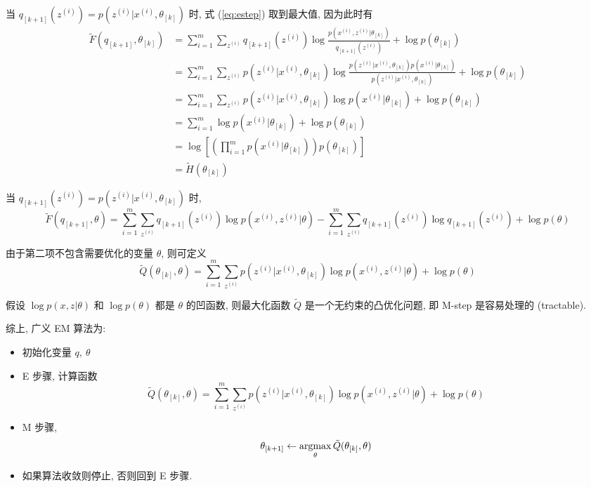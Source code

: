 \documentclass{article}
\begin{document}
当 $q_{[k+1]}(z^{(i)})=p(z^{(i)}|x^{(i)},\theta_{[k]})$ 时, 式 (\ref{eq:estep}) 取到最大值, 因为此时有
\begin{equation}
  \begin{aligned}
    \tilde{F}(q_{[k+1]},\theta_{[k]})
    &=\sum_{i=1}^m\sum_{z^{(i)}}q_{[k+1]}(z^{(i)})\log \frac{p\left(x^{(i)},z^{(i)}|\theta_{[k]}\right)}{q_{[k+1]}(z^{(i)})}+\log p(\theta_{[k]})\\
    &=\sum_{i=1}^m\sum_{z^{(i)}}p(z^{(i)}|x^{(i)},\theta_{[k]})\log \frac{p(z^{(i)}|x^{(i)},\theta_{[k]})p(x^{(i)}|\theta_{[k]})}{p(z^{(i)}|x^{(i)},\theta_{[k]})}+\log p(\theta_{[k]})\\
    &=\sum_{i=1}^m\sum_{z^{(i)}}p(z^{(i)}|x^{(i)},\theta_{[k]})\log p(x^{(i)}|\theta_{[k]})+\log p(\theta_{[k]})\\
    &=\sum_{i=1}^m\log p(x^{(i)}|\theta_{[k]})+\log p(\theta_{[k]})\\
    &=\log\left[\left(\prod_{i = 1}^mp(x^{(i)}|\theta_{[k]})\right)p(\theta_{[k]})\right]\\
    &=\tilde{H}(\theta_{[k]})
  \end{aligned}
  \label{eq:posterior}
\end{equation}

当 $q_{[k+1]}(z^{(i)})=p(z^{(i)}|x^{(i)},\theta_{[k]})$ 时, 
\begin{equation}
  \tilde{F}(q_{[k+1]},\theta)=\sum_{i=1}^m\sum_{z^{(i)}}q_{[k+1]}(z^{(i)})\log p\left(x^{(i)},z^{(i)}|\theta\right)-\sum_{i=1}^m\sum_{z^{(i)}}q_{[k+1]}(z^{(i)})\log q_{[k+1]}(z^{(i)})+\log p(\theta)
\end{equation}

由于第二项不包含需要优化的变量 $\theta$, 则可定义
\begin{equation}
  \tilde{Q}(\theta_{[k]},\theta)=\sum_{i=1}^m\sum_{z^{(i)}}p(z^{(i)}|x^{(i)},\theta_{[k]})\log p\left(x^{(i)},z^{(i)}|\theta\right)+\log p(\theta)
\end{equation}

假设 $\log p(x,z|\theta)$ 和 $\log p(\theta)$ 都是 $\theta$ 的凹函数, 则最大化函数 $\tilde{Q}$ 是一个无约束的凸优化问题, 即 M-step 是容易处理的 (tractable).

综上, 广义 EM 算法为:
\begin{itemize}
  \item 初始化变量 $q,~\theta$
  \item E 步骤, 计算函数 
    \begin{equation}
      \tilde{Q}(\theta_{[k]},\theta)=\sum_{i=1}^m\sum_{z^{(i)}}p(z^{(i)}|x^{(i)},\theta_{[k]})\log p\left(x^{(i)},z^{(i)}|\theta\right)+\log p(\theta)
    \end{equation}
  \item M 步骤, 
    \begin{equation}
      \theta_{[k+1]}\leftarrow\operatorname*{argmax}_{\theta}\tilde{Q}(\theta_{[k]},\theta)
    \end{equation}
  \item 如果算法收敛则停止, 否则回到 E 步骤.
\end{itemize}
\end{document}
